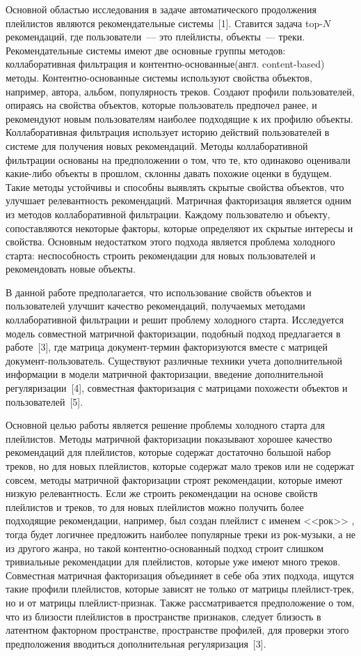 \documentclass[12pt,twoside]{article}
\begin{document}
{Основной областью исследования в задаче автоматического продолжения плейлистов являются рекомендательные системы~[1]. Ставится задача top-$N$ рекомендаций, где пользователи~--- это плейлисты, объекты~--- треки. Рекомендательные системы имеют две основные группы методов: коллаборативная фильтрация и контентно-основанные(англ. content-based) методы. Контентно-основанные системы используют свойства объектов, например, автора, альбом, популярность треков. Создают профили пользователей, опираясь на свойства объектов, которые пользователь предпочел ранее,  и рекомендуют новым пользователям наиболее подходящие к их профилю объекты. Коллаборативная фильтрация использует историю действий пользователей в системе для получения новых рекомендаций. Методы коллаборативной фильтрации основаны на предположении о том, что те, кто одинаково оценивали какие-либо объекты в прошлом, склонны давать похожие оценки в будущем. Такие методы устойчивы и способны выявлять скрытые свойства объектов, что улучшает релевантность рекомендаций. Матричная факторизация является одним из методов коллаборативной фильтрации. Каждому пользователю и объекту, сопоставляются некоторые факторы, которые определяют их скрытые интересы и свойства. Основным недостатком этого подхода является проблема холодного старта: неспособность строить рекомендации для новых пользователей и рекомендовать новые объекты. 

В данной работе предполагается, что использование свойств объектов и пользователей улучшит качество рекомендаций, получаемых методами коллаборативной фильтрации и  решит проблему  холодного старта. Исследуется модель совместной матричной факторизации, подобный подход предлагается в работе~[3], где матрица документ-термин факторизуются вместе с матрицей документ-пользователь. Существуют различные техники учета дополнительной информации в модели матричной факторизации, введение дополнительной регуляризации~[4], совместная факторизация с матрицами похожести объектов и пользователей~[5]. 

Основной целью работы является решение проблемы холодного старта для плейлистов. Методы матричной факторизации показывают хорошее качество рекомендаций для плейлистов, которые содержат достаточно большой набор треков, но для новых плейлистов, которые содержат мало треков или не содержат совсем, методы матричной факторизации строят рекомендации, которые имеют низкую релевантность. Если же строить рекомендации на основе свойств плейлистов и треков, то для новых плейлистов можно получить более подходящие рекомендации, например, был создан плейлист с именем <<рок>> , тогда будет логичнее предложить наиболее популярные треки из рок-музыки, а не из другого жанра, но такой контентно-основанный подход строит слишком тривиальные рекомендации для плейлистов, которые уже имеют много треков. Совместная матричная факторизация объединяет в себе оба этих подхода, ищутся такие профили плейлистов, которые зависят не только от матрицы плейлист-трек, но и от матрицы плейлист-признак. Также рассматривается предположение о том, что из близости плейлистов в пространстве признаков, следует близость в латентном факторном пространстве, пространстве профилей, для проверки этого предположения вводиться дополнительная регуляризация~[3].}
\end{document}
